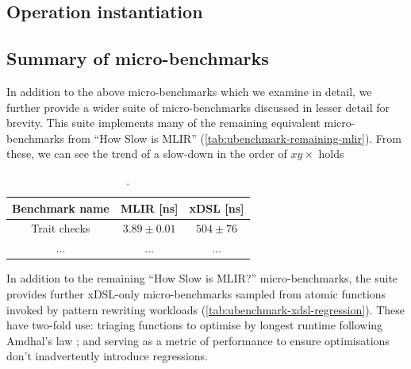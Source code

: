 

\subsection{Operation instantiation}

\subsection{Summary of micro-benchmarks}

In addition to the above micro-benchmarks which we examine in detail, we further provide a wider suite of micro-benchmarks discussed in lesser detail for brevity. %
This suite implements many of the remaining equivalent micro-benchmarks from ``How Slow is MLIR'' (\autoref{tab:ubenchmark-remaining-mlir}).
From these, we can see the trend of a slow-down in the order of $xy\times$ holds 

\begin{table}[H]
  \caption{.}
  \label{tab:ubenchmark-remaining-mlir}
  \centering
  \begin{tabular}{ccc}
    \toprule
    \textbf{Benchmark name} & \textbf{MLIR [ns]} & \textbf{xDSL [ns]}\\
    \midrule
    Trait checks & $3.89 \pm 0.01$ & $504 \pm 76$ \\
    ... & ... & ... \\
    \bottomrule
  \end{tabular}
\end{table}


In addition to the remaining ``How Slow is MLIR?'' micro-benchmarks, the suite provides further xDSL-only micro-benchmarks sampled from atomic functions invoked by pattern rewriting workloads (\autoref{tab:ubenchmark-xdsl-regression}).
These have two-fold use: triaging functions to optimise by longest runtime following Amdhal's law \cite{amdahlValiditySingleProcessor1967}; and serving as a metric of performance to ensure optimisations don't inadvertently introduce regressions.

